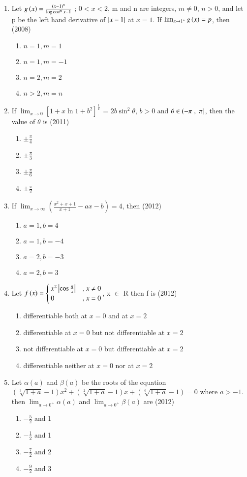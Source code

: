 \documentclass[journal]{IEEEtran}
\numberwithin{equation}{enumi}
\numberwithin{figure}{enumi}
\begin{document}
\begin{enumerate}
	\item Let $g\left(x\right)= \frac{\left(x-1\right)^n}{\log{\cos^m{x-1}}}$ ; $0<x<2$, m and n are integers, $m\neq0$, $n>0$, and let p be the left hand derivative of $\left\vert x-1\right\vert$ at $x=1$. If $\lim_{x \to 1^
		+}
		{g\left(x\right)=p}$, then \hfill{(2008)}
		\begin{enumerate}
			\item $n=1,m=1$
			\item $n=1,m=-1$
			\item $n=2,m=2$
			\item $n>2,m=n$ 
		\end{enumerate}
	\item If $\lim_{x \to 0}[1+x\ln{1+b^2}]^\frac{1}{x}$ = $2b\sin^2{\theta}$, $b>0$ and $\theta \in \left(-\pi\right.,{}\left.\pi\right]$, then the value of $\theta$ is \hfill{(2011)}
		\begin{enumerate}
			\item $\pm\frac{\pi}{4}$
			\item $\pm\frac{\pi}{3}$
			\item $\pm\frac{\pi}{6}$
			\item $\pm\frac{\pi}{2}$ 
		\end{enumerate}
	\item If $\lim_{ x \to \infty}(\frac{x^2+x+1}{x+1}-ax-b) = 4$, then \hfill{(2012)}
		\begin{enumerate}
			\item $a=1,b=4$
			\item $a=1,b=-4$
			\item $a=2,b=-3$
			\item $a=2,b=3$ 
		\end{enumerate}
	\item Let $f\left(x\right) =\begin{cases} x^2\left\vert\cos{\frac{\pi}{x}}\right\vert & \text{, } x \neq 0 \\ 0 & \text{, } x = 0 \end{cases}$, x $\in$ R then f is \hfill{(2012)}
		\begin{enumerate}
			\item differentiable both at $x=0$ and at $x=2$
			\item differentiable at $x=0$ but not differentiable at $x=2$
			\item not differentiable at $x=0$ but differentiable at $x=2$
			\item differentiable neither at $x=0$ nor at $x=2$ 
		\end{enumerate}
	\item Let $\alpha(a)$ and $\beta(a)$ be the roots of the equation $(\sqrt[3]{1+a}-1)x^2+(\sqrt[2]{1+a}-1)x+(\sqrt[6]{1+a}-1)=0$ where $a>-1$. then $\lim_{a \to 0^+}{\alpha(a)}$ and $\lim_{a \to 0^
		+}{\beta(a)}$ are \hfill{(2012)}
		\begin{enumerate}
			\item $-\frac{5}{2}$ and 1
			\item $-\frac{1}{2}$ and 1
			\item $-\frac{7}{2}$ and 2
			\item $-\frac{9}{2}$ and 3 
		\end{enumerate}

\end{enumerate}
\end{document}
